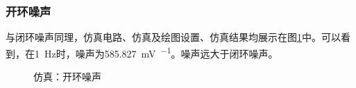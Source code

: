 \documentclass[UTF8]{ctexart}
\numberwithin{figure}{subsection}
\numberwithin{table}{subsection}
\numberwithin{equation}{subsection}
\begin{document}
\subsubsection{开环噪声}
与闭环噪声同理，仿真电路、仿真及绘图设置、仿真结果均展示在图\ref{noise simulation open}中。可以看到，在\SI[]{1}{\hertz}时，噪声为\SI[]{585.827}{\milli\volt\per{\sqrt{\hertz}}}。噪声远大于闭环噪声。

\begin{figure}[H]
    \centering
    \caption{仿真：开环噪声}
    \label{noise simulation open}
\end{figure}
\end{document}
